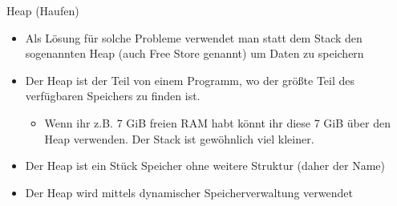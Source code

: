 \documentclass[presentation]{beamer}
\begin{document}
\begin{frame}[label={sec:org30728c1}]{Heap (Haufen)}
\begin{itemize}
\item Als Lösung für solche Probleme verwendet man statt dem Stack den
sogenannten \alert{Heap} (auch \alert{Free Store} genannt) um Daten zu speichern
\item Der Heap ist der Teil von einem Programm, wo der größte Teil des
verfügbaren Speichers zu finden ist.
\begin{itemize}
\item Wenn ihr z.B. 7 GiB freien RAM habt könnt ihr diese 7 GiB über den
Heap verwenden. Der Stack ist gewöhnlich viel kleiner.
\end{itemize}
\item Der Heap ist ein Stück Speicher ohne weitere Struktur (daher der
Name)
\item Der Heap wird mittels \alert{dynamischer Speicherverwaltung} verwendet
\end{itemize}
\end{frame}
\end{document}
